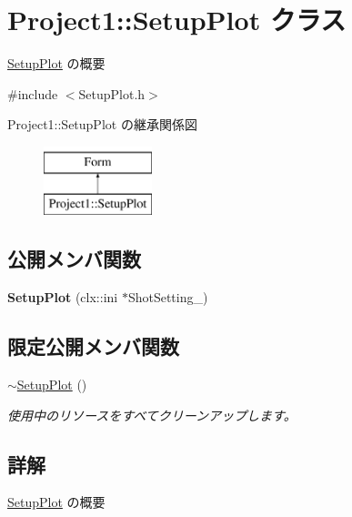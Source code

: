 \hypertarget{class_project1_1_1_setup_plot}{}\section{Project1\+:\+:Setup\+Plot クラス}
\label{class_project1_1_1_setup_plot}


\hyperlink{class_project1_1_1_setup_plot}{Setup\+Plot} の概要  




{\ttfamily \#include $<$Setup\+Plot.\+h$>$}

Project1\+:\+:Setup\+Plot の継承関係図\begin{figure}[H]
\begin{center}
\leavevmode
\includegraphics[height=2.000000cm]{class_project1_1_1_setup_plot}
\end{center}
\end{figure}
\subsection*{公開メンバ関数}
\begin{DoxyCompactItemize}
\item 
\mbox{\label{class_project1_1_1_setup_plot_a45203c01dce8ca7a6871ff50c10051cd}} 
{\bfseries Setup\+Plot} (clx\+::ini $\ast$Shot\+Setting\+\_\+)
\end{DoxyCompactItemize}
\subsection*{限定公開メンバ関数}
\begin{DoxyCompactItemize}
\item 
\hyperlink{class_project1_1_1_setup_plot_a99164cdf31bea63c1f4e01204e381538}{$\sim$\+Setup\+Plot} ()
\begin{DoxyCompactList}\small\item\em 使用中のリソースをすべてクリーンアップします。 \end{DoxyCompactList}\end{DoxyCompactItemize}


\subsection{詳解}
\hyperlink{class_project1_1_1_setup_plot}{Setup\+Plot} の概要 



